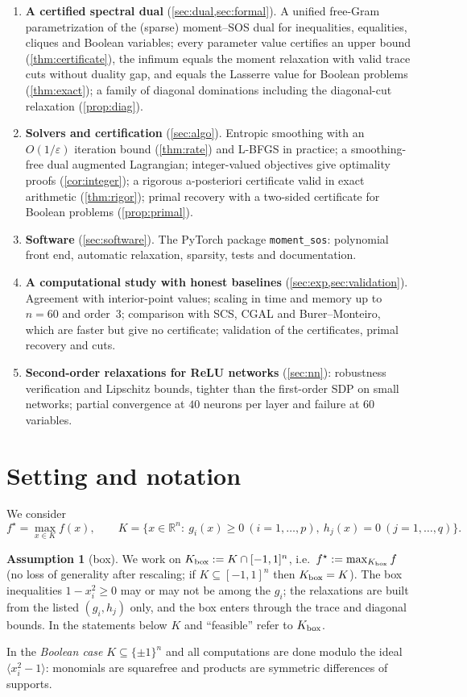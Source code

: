 \documentclass[a4paper,11pt]{article}
\theoremstyle{plain}
\theoremstyle{definition}
\newtheorem{assumption}{Assumption}
\theoremstyle{remark}
\newcommand{\R}{\mathbb{R}}
\begin{document}
\begin{enumerate}[label=(\alph*),leftmargin=2em]
\item \textbf{A certified spectral dual} (\cref{sec:dual,sec:formal}). A unified free-Gram parametrization of the (sparse) moment--SOS dual for inequalities, equalities, cliques and Boolean variables; every parameter value certifies an upper bound (\cref{thm:certificate}), the infimum equals the moment relaxation with valid trace cuts without duality gap, and equals the Lasserre value for Boolean problems (\cref{thm:exact}); a family of diagonal dominations including the diagonal-cut relaxation (\cref{prop:diag}).
\item \textbf{Solvers and certification} (\cref{sec:algo}). Entropic smoothing with an $O(1/\varepsilon)$ iteration bound (\cref{thm:rate}) and L-BFGS in practice; a smoothing-free dual augmented Lagrangian; integer-valued objectives give optimality proofs (\cref{cor:integer}); a rigorous a-posteriori certificate valid in exact arithmetic (\cref{thm:rigor}); primal recovery with a two-sided certificate for Boolean problems (\cref{prop:primal}).
\item \textbf{Software} (\cref{sec:software}). The PyTorch package \texttt{moment\_sos}: polynomial front end, automatic relaxation, sparsity, tests and documentation.
\item \textbf{A computational study with honest baselines} (\cref{sec:exp,sec:validation}). Agreement with interior-point values; scaling in time and memory up to $n=60$ and order~$3$; comparison with SCS, CGAL and Burer--Monteiro, which are faster but give no certificate; validation of the certificates, primal recovery and cuts.
\item \textbf{Second-order relaxations for ReLU networks} (\cref{sec:nn}): robustness verification and Lipschitz bounds, tighter than the first-order SDP on small networks; partial convergence at $40$ neurons per layer and failure at $60$ variables.
\end{enumerate}

\section{Setting and notation}\label{sec:setting}
We consider
\begin{equation}\label{eq:pop}
f^\star=\max_{x\in K} f(x),\qquad K=\{x\in\R^n:\ g_i(x)\ge0\ (i=1,\dots,p),\ h_j(x)=0\ (j=1,\dots,q)\}.
\end{equation}
\begin{assumption}[box]\label{ass:box}
We work on $K_{\rm box}:=K\cap[-1,1]^n$, i.e.\ $f^\star:=\max_{K_{\rm box}}f$ (no loss of generality after rescaling; if $K\subseteq[-1,1]^n$ then $K_{\rm box}=K$). The box inequalities $1-x_i^2\ge0$ may or may not be among the $g_i$; the relaxations are built from the listed $(g_i,h_j)$ only, and the box enters through the trace and diagonal bounds. In the statements below $K$ and ``feasible'' refer to $K_{\rm box}$.
\end{assumption}
In the \emph{Boolean case} $K\subseteq\{\pm1\}^n$ and all computations are done modulo the ideal $\langle x_i^2-1\rangle$: monomials are squarefree and products are symmetric differences of supports.
\end{document}

